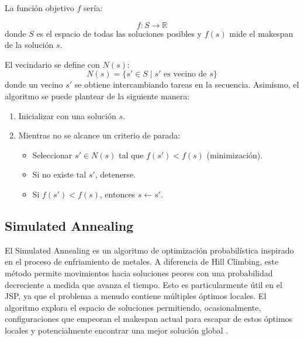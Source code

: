 \documentclass[11pt]{article}
\begin{document}
\vspace{1em}
\noindent  La función objetivo \( f \) sería: 

    \[
    f: S \rightarrow \mathbb{R}
    \]
    donde \( S \) es el espacio de todas las soluciones posibles y \( f(s) \) mide el makespan de la solución \( s \).

\noindent El vecindario se define con \( N(s) \):
    \[
    N(s) = \{ s' \in S \mid s' \text{ es vecino de } s \}
    \]
donde un vecino \( s' \) se obtiene intercambiando tareas en la secuencia. Asimismo, el algoritmo se puede plantear de la siguiente manera:
    \begin{enumerate}
        \item Inicializar con una solución \( s \).
        \item Mientras no se alcance un criterio de parada:
        \begin{itemize}
            \item Seleccionar \( s' \in N(s) \) tal que \( f(s') < f(s) \) (minimización).
            \item Si no existe tal \( s' \), detenerse.
            \item Si \( f(s') < f(s) \), entonces \( s \leftarrow s' \).
        \end{itemize}
    \end{enumerate}

\subsection{Simulated Annealing}
El Simulated Annealing es un algoritmo de optimización probabilística inspirado en el proceso de enfriamiento de metales. A diferencia de Hill Climbing, este método permite movimientos hacia soluciones peores con una probabilidad decreciente a medida que avanza el tiempo. Esto es particularmente útil en el JSP, ya que el problema a menudo contiene múltiples óptimos locales. El algoritmo explora el espacio de soluciones permitiendo, ocasionalmente, configuraciones que empeoran el makespan actual para escapar de estos óptimos locales y potencialmente encontrar una mejor solución global \citep{chatgpt}.
\end{document}
